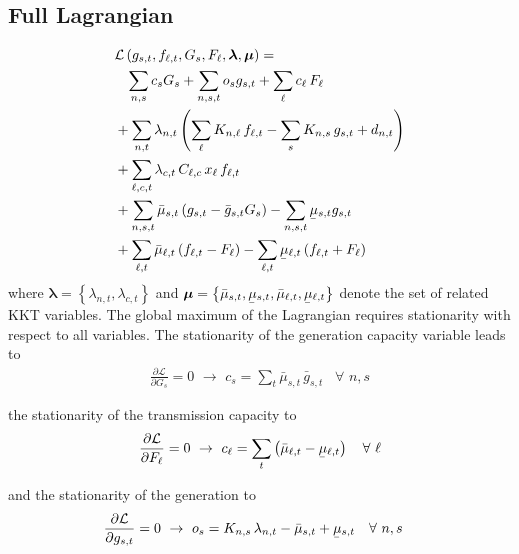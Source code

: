 \documentclass[11pt,twocolumn]{article}
\newcommand{\ubar}[1]{\underaccent{\bar}{#1}}
\newcommand{\Forall}[1]{\hspace{10pt} \forall \,\, #1 }
\newcommand{\pdv}[2]{\frac{\partial #1}{\partial #2}}
\newcommand{\generation}{g_{s,t}}
\newcommand{\generationpotential}{\bar{g}_{s,t}}
\newcommand{\capacitygeneration}{G_{s}}
\newcommand{\operationalpricegeneration}{o_{s}}
\newcommand{\capitalpricegeneration}{c_{s}}
\newcommand{\mulowergeneration}{\ubar{\mu}_{s,t}}
\newcommand{\muuppergeneration}{\bar{\mu}_{s,t}}
\newcommand{\flow}{f_{\ell,t}}
\newcommand{\capacityflow}{F_{\ell}}
\newcommand{\capitalpriceflow}{c_{\ell}}
\newcommand{\mulowerflow}{\ubar{\mu}_{\ell,t}}
\newcommand{\muupperflow}{\bar{\mu}_{\ell,t}}
\newcommand{\lagrangian}{\mathcal{L}}
\newcommand{\lmp}[1][n]{\lambda_{#1,t}}
\newcommand{\demand}[1][n]{d_{#1,t}}
\newcommand{\incidence}[1][n]{K_{#1,\ell}}
\newcommand{\incidencegenerator}[1][n]{K_{#1,s}}
\newcommand{\cycle}{C_{\ell,c}}
\newcommand{\impedance}{x_\ell}
\newcommand{\cycleprice}{\lambda_{c,t}}
\begin{document}
\subsection{Full Lagrangian}
\label{sec:full_lagrangian}
\begin{align}
\notag
& \lagrangian\left(\generation, \flow, \capacitygeneration, \capacityflow, \boldsymbol{\lambda}, \boldsymbol{\mu} \right)   =   \\  
\notag
& \;\;\; \sum_{n,s} \capitalpricegeneration \capacitygeneration + \sum_{n, s, t} \operationalpricegeneration \generation + \sum_{\ell} \capitalpriceflow \, \capacityflow  \\
\notag
&+ \sum_{n,t} \lmp \left(\sum_\ell \incidence \, \flow  - \sum_s \incidencegenerator\, \generation +  \demand  \right)  \\ 
\notag
&+ \sum_{\ell,c,t} \cycleprice \, \cycle \, \impedance \, \flow  \\
\notag
&+ \sum_{n,s,t} \muuppergeneration \left( \generation - \generationpotential \capacitygeneration \right)  - \sum_{n,s,t} \mulowergeneration \generation  \\
&+ \sum_{\ell,t} \muupperflow \left( \flow - \capacityflow \right) - \sum_{\ell,t} \mulowerflow \left( \flow + \capacityflow \right)     
\label{eq:full_lagrangian}
\end{align}
% 
where $\boldsymbol{\lambda} = \left\lbrace \lmp, \cycleprice \right\rbrace $ and $\boldsymbol{\mu} = \left\lbrace \muuppergeneration, \mulowergeneration, \muupperflow, \mulowerflow \right\rbrace $ denote the set of related KKT variables. The global maximum of the Lagrangian requires stationarity with respect to all variables. The stationarity of the generation capacity variable leads to 
\begin{align}
\pdv{\lagrangian}{\capacitygeneration}  = 0 \,\, \rightarrow \,\, 
\capitalpricegeneration =  \sum_t \muuppergeneration \, \generationpotential  \Forall{n,s}
\label{eq:capex_generation_duality}
\end{align}

the stationarity of the transmission capacity to
\begin{align}
\pdv{\lagrangian}{\capacityflow} = 0 \,\, \rightarrow \,\, 
\capitalpriceflow =  \sum_t \left( \muupperflow - \mulowerflow \right) \Forall{\ell}
\label{eq:capexFlow_duality}
\end{align}


and the stationarity of the generation to 
\begin{align}
\pdv{\lagrangian}{\generation} &= 0 \,\, \rightarrow \,\,  
\operationalpricegeneration =  \incidencegenerator \, \lmp - \muuppergeneration + \mulowergeneration \Forall{n,s} \label{eq:opex_duality}
\end{align}
\end{document}
